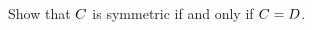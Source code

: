 \documentclass[main.tex]{subfiles}
\begin{document}
\subproblem{}\label{s03p14a}

Show that \({C}\) is symmetric if and only if
\({C} = {D}\).

\todo{}
\end{document}
